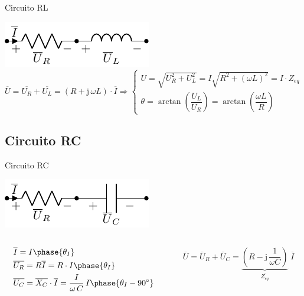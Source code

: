 \documentclass[aspectratio=169, xcolor={usenames,svgnames,dvipsnames}]{beamer}
\begin{document}
\begin{frame}{Circuito RL}
\begin{center}
\includegraphics[height=0.15\textheight]{../figs/RL.pdf}
\begin{equation*}
		\overline{U} = \overline{U_R} + \overline{U_L} =(R + \mathrm{j}\,\omega L) \cdot \overline{I}\Rightarrow 
		\begin{cases}
			U=\sqrt{U_R^2+U_L^2}=I\sqrt{R^2+(\omega L)^2}=I\cdot Z_{eq}\\
			\theta=\arctan\left( \dfrac{U_L}{U_R}\right)=\arctan\left( \dfrac{\omega L}{R}\right)
		\end{cases}
	\end{equation*}
\end{center}
\end{frame}

\subsection{Circuito RC} 

\begin{frame}{Circuito RC}
\begin{center}
\includegraphics[height=0.2\textheight]{../figs/RC.pdf}
\end{center}

\begin{columns}
\begin{column}{0.45\columnwidth}
\begin{align*}
&\overline{I}=I\phase{\theta_I}\\
    &\overline{U_R} = R \overline{I}=R\cdot I\phase{\theta_I}\\ 
	&\overline{U_C}=\overline{X_C}\cdot\overline{I}= \dfrac{I}{\omega\,C}\,I\phase{\theta_I-90^\circ}
\end{align*}
\end{column}

\begin{column}{0.55\columnwidth}
\begin{equation*}
  \overline{U} = \overline{U}_R + \overline{U}_C =\underbrace{\left(R - \mathrm{j}\,\dfrac{1}{\omega C}\right)}_{\overline{Z_{eq}}}\; \overline{I}
\end{equation*}
\end{column}
\end{columns}
\end{frame}
\end{document}
